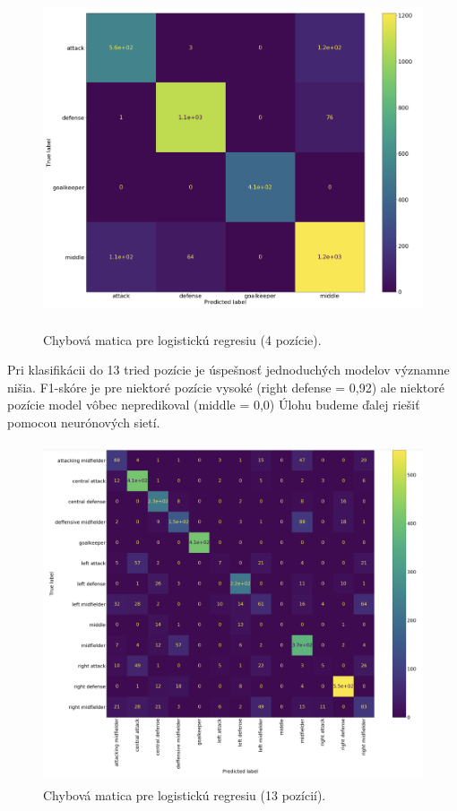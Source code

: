 \documentclass[runningheads]{llncs}
\begin{document}
    \begin{figure}[htp]
        \centering
        \includegraphics[height=10cm]{images/confusion_matrix_position4_logicticCV}
        \caption{Chybová matica pre logistickú regresiu (4 pozície).}
        \label{fig:confusion_4}
    \end{figure}

Pri klasifikácii do 13 tried pozície je úspešnosť jednoduchých modelov významne nišia. F1-skóre je pre niektoré pozície vysoké (right defense = 0,92) ale niektoré pozície model vôbec nepredikoval (middle = 0,0) 
Úlohu budeme ďalej riešiť pomocou neurónových sietí. 

\begin{figure}[htp]
    \centering
    \includegraphics[height=10cm]{images/confusion_matrix_position13_logisticCV}
    \caption{Chybová matica pre logistickú regresiu (13 pozícií).}
    \label{fig:confusion_4}
\end{figure}
\end{document}
